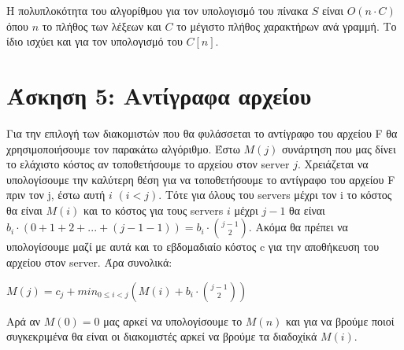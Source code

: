 \documentclass[a4paper,12pt]{report}
\begin{document}

H πολυπλοκότητα του αλγορίθμου για τον υπολογισμό του πίνακα $S$ είναι $O(n \cdot C)$ όπου $n$ το πλήθος των λέξεων και $C$ το μέγιστο πλήθος χαρακτήρων ανά γραμμή. Το ίδιο ισχύει και για τον υπολογισμό του $C[n]$.

\section*{Άσκηση 5: Αντίγραφα αρχείου}
Για την επιλογή των διακομιστών που θα φυλάσσεται το αντίγραφο του αρχείου F θα χρησιμοποιήσουμε τον παρακάτω αλγόριθμο. Έστω $M(j)$ συνάρτηση που μας δίνει το ελάχιστο κόστος αν τοποθετήσουμε το αρχείου στον server $j$. Χρειάζεται να υπολογίσουμε την καλύτερη θέση για να τοποθετήσουμε το αντίγραφο του αρχείου F πριν τον j, έστω αυτή $i$ $(i<j)$. Tότε για όλους του servers μέχρι τον i το κόστος θα είναι $M(i)$ και το κόστος για τους  servers $i$ μέχρι $j-1$ θα είναι $b_i \cdot (0+1+2+...+(j-1-1)) = b_i \cdot \binom {j-1}{2} $. Ακόμα θα πρέπει να υπολογίσουμε μαζί με αυτά και το εβδομαδιαίο κόστος c για την αποθήκευση του αρχείου στον server. Άρα συνολικά:
\begin{center}
 $M(j)=c_j + min_{0 \leq i<j}(M(i)+b_i \cdot \binom {j-1}{2})$
\end{center}

Αρά αν $M(0)=0$ μας αρκεί να υπολογίσουμε το $M(n)$ και για να βρούμε ποιοί συγκεκριμένα θα είναι οι διακομιστές αρκεί να βρούμε τα διαδοχίκά $M(i)$. 
\end{document}
